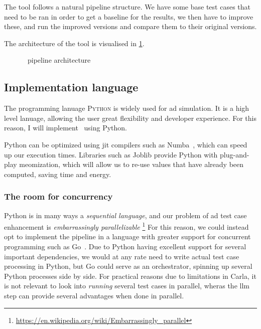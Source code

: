 The tool follows a natural pipeline structure. We have some base test cases that
need to be ran in order to get a baseline for the results, we then have to
improve these, and run the improved versions and compare them to their original
versions. 

The architecture of the tool is visualised in \cref{fig:hefeArch}.

\begin{figure}[h]
    \centering
    
    \caption{\hefe~pipeline architecture}\label{fig:hefeArch}
\end{figure}

\subsection{Implementation language}

The programming lanuage \textsc{Python} is widely used for \acrfull{ad} simulation. It is a high
level lanuage, allowing the user great flexibility and developer experience. For this reason, I will
implement \hefe~using Python.

Python can be optimized using \acrfull{jit} compilers such as Numba~\cite{numba}, which can speed up
our execution times. Libraries such as Joblib provide Python with plug-and-play
meomization, which will allow us to re-use values that have already been
computed, saving time and energy.

 \subsubsection{The room for concurrency}
 
 Python is in many ways a \textit{sequential language},  and our problem of
 \acrshort{ad} test case enhancement is \textit{embarrassingly parallelizable}
 \footnote{\url{https://en.wikipedia.org/wiki/Embarrassingly_parallel}}
 For this reason, we could instead  opt to implement the pipeline in a language
 with greater support for concurrent  programming such as  Go~\cite[102]{go}.
 Due to Python having excellent support for several important 
 dependencies, we would at any rate need to write actual test case processing in
 Python, but Go could serve as an orchestrator, spinning up several Python
 processes side by side.
 For practical reasons due to limitations in Carla, it is not relevant to look
 into \textit{running} several test cases in parallel, wheras the \acrshort{llm}
 step can provide several advantages when done in parallel.

